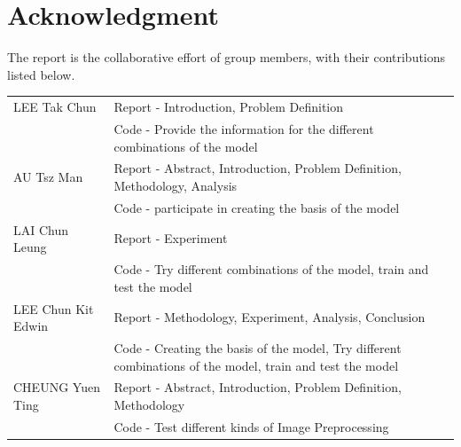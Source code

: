 \documentclass[journal,onecolumn, 12pt]{IEEEtran}
\begin{document}


\section*{Acknowledgment}


The report is the collaborative effort of group members, with their contributions listed below.\\

\begin{tabular}{l p{13.5cm}}
  \hline
  LEE Tak Chun & Report - Introduction, Problem Definition \\ 
  {} & Code - Provide the information for the different combinations of the model\\
  AU Tsz Man & Report - Abstract, Introduction, Problem Definition, Methodology, Analysis \\ 
  {} & Code - participate in creating the basis of the model\\
  LAI Chun Leung & Report - Experiment \\ 
  {} & Code - Try different combinations of the model, train and test the model\\
  LEE Chun Kit Edwin & Report - Methodology, Experiment, Analysis, Conclusion \\ 
  {} & Code - Creating the basis of the model, Try different combinations of the model, train and test the model\\
  CHEUNG Yuen Ting & Report - Abstract, Introduction, Problem Definition, Methodology \\ 
  {} & Code - Test different kinds of Image Preprocessing\\
  \hline
\end{tabular}




\end{document}
